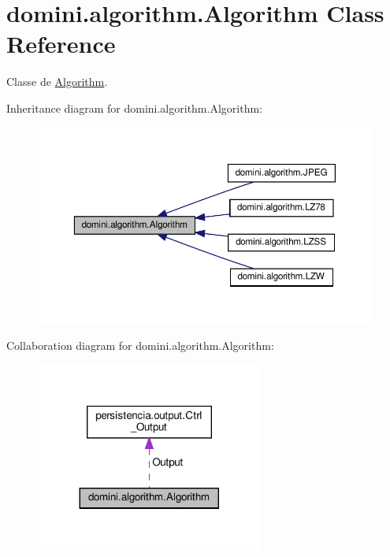 \hypertarget{classdomini_1_1algorithm_1_1Algorithm}{}\section{domini.\+algorithm.\+Algorithm Class Reference}
\label{classdomini_1_1algorithm_1_1Algorithm}


Classe de \hyperlink{classdomini_1_1algorithm_1_1Algorithm}{Algorithm}.  




Inheritance diagram for domini.\+algorithm.\+Algorithm\+:
\nopagebreak
\begin{figure}[H]
\begin{center}
\leavevmode
\includegraphics[width=350pt]{classdomini_1_1algorithm_1_1Algorithm__inherit__graph}
\end{center}
\end{figure}


Collaboration diagram for domini.\+algorithm.\+Algorithm\+:
\nopagebreak
\begin{figure}[H]
\begin{center}
\leavevmode
\includegraphics[width=212pt]{classdomini_1_1algorithm_1_1Algorithm__coll__graph}
\end{center}
\end{figure}
